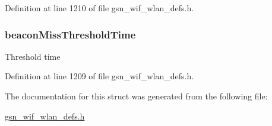 Definition at line 1210 of file gsn\_\-wif\_\-wlan\_\-defs.h.

\hypertarget{a00372_af109723ccdee8fd64b8f17699c9af723}{
\subsubsection[{beaconMissThresholdTime}]{ {\bf beaconMissThresholdTime}}}
\label{a00372_af109723ccdee8fd64b8f17699c9af723}
Threshold time 

Definition at line 1209 of file gsn\_\-wif\_\-wlan\_\-defs.h.



The documentation for this struct was generated from the following file:\begin{DoxyCompactItemize}
\item 
\hyperlink{a00613}{gsn\_\-wif\_\-wlan\_\-defs.h}\end{DoxyCompactItemize}
